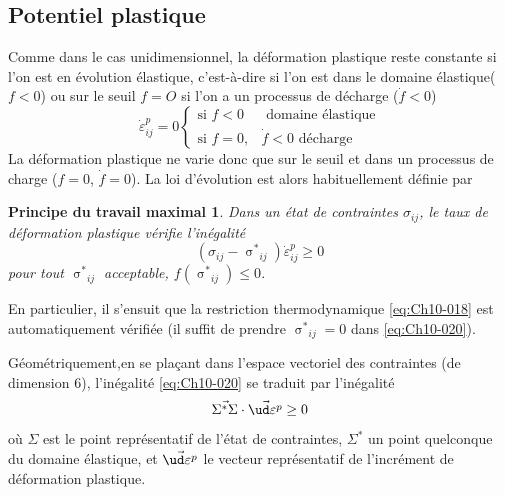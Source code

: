 \subsection{Potentiel plastique} \label{ssec:Ch10-1.3}
Comme dans le cas unidimensionnel, la déformation plastique reste constante si l'on est en évolution élastique, c'est-à-dire si l'on est dans le domaine élastique($f<0$) ou sur le seuil $f=O$ si l'on a un processus de décharge ($\dot{f} < 0$) 
\begin{equation}
    \dot{\varepsilon}_{ij}^p = 0
    \begin{cases}
        \text{si } f < 0 & \text{ domaine élastique} \\
        \text{si } f = 0, & \dot{f}<0 \text{ décharge}
    \end{cases}
    \label{eq:Ch10-019}
\end{equation}
La déformation plastique ne varie donc que sur le seuil et dans un processus de charge ($f=0$, $\dot{f}=0$).
La loi d'évolution est alors habituellement définie par 
\newtheorem*{PTM}{Principe du travail maximal}
\begin{PTM}
    Dans un état de contraintes $\sigma_{ij}$, le taux de 
déformation plastique vérifie l'inégalité 
    \begin{equation}
        \left( \sigma_{ij} - {\mathop{\sigma}^{\ast}}_{ij} \right) \dot{\varepsilon}_{ij}^p \geq 0
        \label{eq:Ch10-020}
    \end{equation}
    pour tout $\displaystyle {\mathop{\sigma}^{\ast}}_{ij}$ acceptable, $\displaystyle f\left( {\mathop{\sigma}^{\ast}}_{ij} \right) \leq 0$.
\end{PTM}

En particulier, il s'ensuit que la restriction thermodynamique \eqref{eq:Ch10-018} est automatiquement vérifiée (il suffit de prendre $\displaystyle {\mathop{\sigma}^{\ast}}_{ij}=0$ dans \eqref{eq:Ch10-020}). 

Géométriquement,en se plaçant dans l'espace vectoriel des contraintes (de dimension 6), l'inégalité \eqref{eq:Ch10-020} se traduit par l'inégalité 
\begin{equation}
    \vec{\Sigma^{\ast} \Sigma} \cdot \vec{\ud \varepsilon^p} \geq 0
    \label{eq:Ch10-021}
\end{equation}
où $\Sigma$ est le point représentatif de l'état de contraintes, $\Sigma^{\ast}$ un point quelconque du domaine élastique, et $\vec{\ud \varepsilon^p}$ le vecteur représentatif de l'incrément de déformation plastique. 

